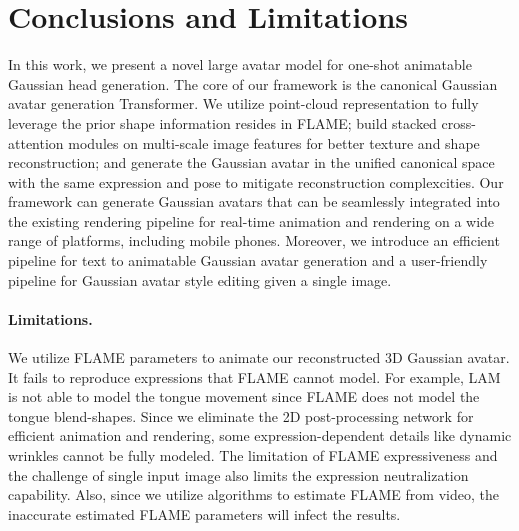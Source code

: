 \section{Conclusions and Limitations}

In this work, we present a novel large avatar model for one-shot animatable Gaussian head generation. The core of our framework is the canonical Gaussian avatar generation Transformer. We utilize point-cloud representation to fully leverage the prior shape information resides in FLAME; build stacked cross-attention modules on multi-scale image features for better texture and shape reconstruction; and generate the Gaussian avatar in the unified canonical space with the same expression and pose to mitigate reconstruction complexcities.  Our framework can generate Gaussian avatars that can be seamlessly integrated into the existing rendering pipeline for real-time animation and rendering on a wide range of platforms, including mobile phones. Moreover, we introduce an efficient pipeline for text to animatable Gaussian avatar generation and a user-friendly pipeline for Gaussian avatar style editing given a single image. 

\paragraph{Limitations.} We utilize FLAME parameters to animate our reconstructed 3D Gaussian avatar. It fails to reproduce expressions that FLAME cannot model. For example, LAM is not able to model the tongue movement since FLAME does not model the tongue blend-shapes. Since we eliminate the 2D post-processing network for efficient animation and rendering, some expression-dependent details like dynamic wrinkles cannot be fully modeled. The limitation of FLAME expressiveness and the challenge of single input image also limits the expression neutralization capability. Also, since we utilize algorithms to estimate FLAME from video, the inaccurate estimated FLAME parameters will infect the results. 